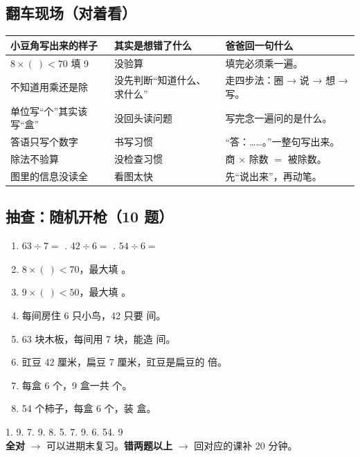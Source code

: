 \subsection{翻车现场（对着看）}

\begin{center}
\small
\begin{tabularx}{\linewidth}{@{}p{3.8cm}p{4.0cm}X@{}}
\toprule
\textbf{小豆角写出来的样子} & \textbf{其实是想错了什么} & \textbf{爸爸回一句什么} \\
\midrule
$8\times(\ )<70$ 填 9 & 没验算 & 填完必须乘一遍。 \\
\addlinespace[2pt]
不知道用乘还是除 & 没先判断“知道什么、求什么” & 走四步法：圈 → 说 → 想 → 写。 \\
\addlinespace[2pt]
单位写“个”其实该写“盒” & 没回头读问题 & 写完念一遍问的是什么。 \\
\addlinespace[2pt]
答语只写个数字 & 书写习惯 & “答：……。”一整句写出来。 \\
\addlinespace[2pt]
除法不验算 & 没检查习惯 & 商 $\times$ 除数 $=$ 被除数。 \\
\addlinespace[2pt]
图里的信息没读全 & 看图太快 & 先“说出来”，再动笔。 \\
\bottomrule
\end{tabularx}
\end{center}

\subsection{抽查：随机开枪（10 题）}

\begin{enumerate}[label=\arabic*.,itemsep=4pt]
  \item $63\div7=$ \blank[1.4cm] . $42\div6=$ \blank[1.4cm] . $54\div6=$ \blank[1.4cm]
  \item $8\times(\ )<70$，最大填 \blank[1.4cm]。
  \item $9\times(\ )<50$，最大填 \blank[1.4cm]。
  \item 每间房住 6 只小鸟，42 只要 \blank[1.4cm] 间。
  \item 63 块木板，每间用 7 块，能造 \blank[1.4cm] 间。
  \item 豇豆 42 厘米，扁豆 7 厘米，豇豆是扁豆的 \blank[1.4cm] 倍。
  \item 每盒 6 个，9 盒一共 \blank[1.4cm] 个。
  \item 54 个柿子，每盒 6 个，装 \blank[1.4cm] 盒。
\end{enumerate}

\begin{ansbox}
1. 9. 7. 9. 8. 5. 7. 9. 6. 54. 9 \\
\textbf{全对} $\to$ 可以进期末复习。\textbf{错两题以上} $\to$ 回对应的课补 20 分钟。
\end{ansbox}
